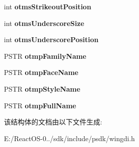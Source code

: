 \begin{DoxyCompactItemize}
int {\bfseries otms\+Strikeout\+Position}
\item 
\mbox{\label{struct___o_u_t_l_i_n_e_t_e_x_t_m_e_t_r_i_c_a_adb90dbc45245dced193d9f7a42e41a5f}} 
int {\bfseries otms\+Underscore\+Size}
\item 
\mbox{\label{struct___o_u_t_l_i_n_e_t_e_x_t_m_e_t_r_i_c_a_ada1d747a1b76ce0a1d48f7dc18fd0a89}} 
int {\bfseries otms\+Underscore\+Position}
\item 
\mbox{\label{struct___o_u_t_l_i_n_e_t_e_x_t_m_e_t_r_i_c_a_abd19c6a1685ba7e712a169bc0ad375af}} 
P\+S\+TR {\bfseries otmp\+Family\+Name}
\item 
\mbox{\label{struct___o_u_t_l_i_n_e_t_e_x_t_m_e_t_r_i_c_a_ac32ab347c0549c70897af52fe360c517}} 
P\+S\+TR {\bfseries otmp\+Face\+Name}
\item 
\mbox{\label{struct___o_u_t_l_i_n_e_t_e_x_t_m_e_t_r_i_c_a_ac72d92dab73604d846aa2b11b3bd4ae3}} 
P\+S\+TR {\bfseries otmp\+Style\+Name}
\item 
\mbox{\label{struct___o_u_t_l_i_n_e_t_e_x_t_m_e_t_r_i_c_a_a6215de12b8ba838015cf8c549a761ab4}} 
P\+S\+TR {\bfseries otmp\+Full\+Name}
\end{DoxyCompactItemize}


该结构体的文档由以下文件生成\+:\begin{DoxyCompactItemize}
\item 
E\+:/\+React\+O\+S-\/0../sdk/include/psdk/wingdi.\+h\end{DoxyCompactItemize}
